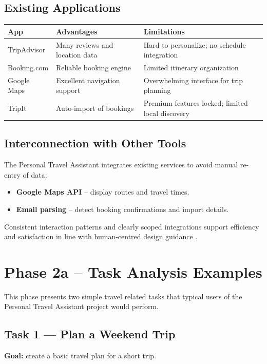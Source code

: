 \documentclass[11pt,a4paper]{article}
\begin{document}
\subsection{Existing Applications}
\begin{tabularx}{\linewidth}{l X X}
\toprule
\textbf{App} & \textbf{Advantages} & \textbf{Limitations} \\
\midrule
TripAdvisor & Many reviews and location data & Hard to personalize; no schedule integration \\
Booking.com & Reliable booking engine & Limited itinerary organization \\
Google Maps & Excellent navigation support & Overwhelming interface for trip planning \\
TripIt & Auto-import of bookings & Premium features locked; limited local discovery \\
\bottomrule
\end{tabularx}

\subsection{Interconnection with Other Tools}
The Personal Travel Assistant integrates existing services to avoid manual re-entry of data:
\begin{itemize}
  \item \textbf{Google Maps API} – display routes and travel times.
  \item \textbf{Email parsing} – detect booking confirmations and import details.
\end{itemize}
Consistent interaction patterns and clearly scoped integrations support efficiency and satisfaction in line with human-centred design guidance \cite{iso9241}.

\newpage
{}
\section*{Phase 2a – Task Analysis Examples}

This phase presents two simple travel related tasks that typical users of the Personal Travel Assistant project would perform.

\subsection{Task 1 — Plan a Weekend Trip}
\textbf{Goal:} create a basic travel plan for a short trip.
\end{document}
